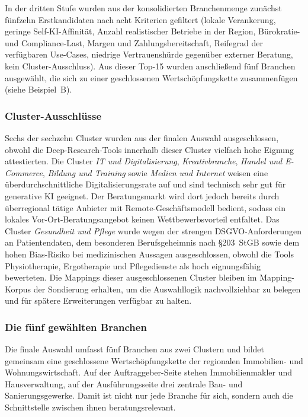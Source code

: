 \documentclass[a4paper,11pt]{article}
\begin{document}
In der dritten Stufe wurden aus der konsolidierten Branchenmenge
zunächst fünfzehn Erstkandidaten nach acht Kriterien gefiltert (lokale
Verankerung, geringe Self-KI-Affinität, Anzahl realistischer Betriebe
in der Region, Bürokratie- und Compliance-Last, Margen und
Zahlungsbereitschaft, Reifegrad der verfügbaren Use-Cases, niedrige
Vertrauenshürde gegenüber externer Beratung, kein Cluster-Ausschluss).
Aus dieser Top-15 wurden anschließend fünf Branchen ausgewählt, die
sich zu einer geschlossenen Wertschöpfungskette zusammenfügen (siehe
Beispiel~B).

\subsubsection{Cluster-Ausschlüsse}

Sechs der sechzehn Cluster wurden aus der finalen Auswahl ausgeschlossen,
obwohl die Deep-Research-Tools innerhalb dieser Cluster vielfach hohe
Eignung attestierten. Die Cluster \emph{IT und Digitalisierung},
\emph{Kreativbranche}, \emph{Handel und E-Commerce}, \emph{Bildung und
Training} sowie \emph{Medien und Internet} weisen eine
überdurchschnittliche Digitalisierungsrate auf und sind technisch sehr
gut für generative KI geeignet. Der Beratungsmarkt wird dort jedoch
bereits durch überregional tätige Anbieter mit Remote-Geschäfts\-modell
bedient, sodass ein lokales Vor-Ort-Beratungsangebot keinen
Wettbewerbsvorteil entfaltet. Das Cluster \emph{Gesundheit und Pflege}
wurde wegen der strengen DSGVO-Anforderungen an Patienten\-daten, dem
besonderen Berufs\-geheimnis nach §203~StGB sowie dem hohen
Bias-Risiko bei medizinischen Aussagen ausgeschlossen, obwohl die Tools
Physiotherapie, Ergotherapie und Pflegedienste als hoch eignungsfähig
bewerteten. Die Mappings dieser ausgeschlossenen Cluster bleiben im
Mapping-Korpus der Sondierung erhalten, um die Auswahllogik
nachvollziehbar zu belegen und für spätere Erweiterungen verfügbar zu
halten.

\subsubsection{Die fünf gewählten Branchen}

Die finale Auswahl umfasst fünf Branchen aus zwei Clustern und bildet
gemeinsam eine geschlossene Wertschöpfungskette der regionalen
Immobilien- und Wohnungswirtschaft. Auf der Auftraggeber-Seite stehen
Immobilien\-makler und Hausverwaltung, auf der Ausführungs\-seite drei
zentrale Bau- und Sanierungsgewerke. Damit ist nicht nur jede Branche
für sich, sondern auch die Schnittstelle zwischen ihnen
beratungs\-relevant.
\end{document}
